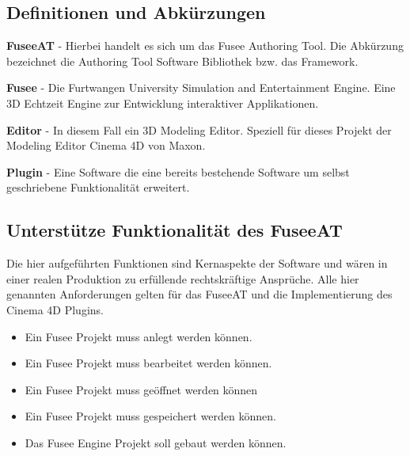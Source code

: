 \documentclass[pagesize, paper=a4, fontsize=12pt, titlepage=true, headings=small, headnosepline, abstractoff, liststotoc, nochapterprefix, plainheadsepline, twoside]{scrreprt}
\begin{document}
\subsection{Definitionen und Abkürzungen}
\textbf{FuseeAT} - Hierbei handelt es sich um das Fusee Authoring Tool. Die Abkürzung bezeichnet die Authoring Tool Software Bibliothek bzw. das Framework.

\textbf{Fusee} - Die Furtwangen University Simulation and Entertainment Engine. Eine 3D Echtzeit Engine zur Entwicklung interaktiver Applikationen.

\textbf{Editor} - In diesem Fall ein 3D Modeling Editor. Speziell für dieses Projekt der Modeling Editor Cinema 4D von Maxon.

\textbf{Plugin} - Eine Software die eine bereits bestehende Software um selbst geschriebene Funktionalität erweitert.

\subsection{Unterstütze Funktionalität des FuseeAT}
Die hier aufgeführten Funktionen sind Kernaspekte der Software und wären in einer realen Produktion zu erfüllende rechtskräftige Ansprüche. Alle hier genannten Anforderungen gelten für das FuseeAT und die Implementierung des Cinema 4D Plugins.
\begin{itemize}
\item Ein Fusee Projekt muss anlegt werden können.
\item Ein Fusee Projekt muss bearbeitet werden können.
\item Ein Fusee Projekt muss geöffnet werden können
\item Ein Fusee Projekt muss gespeichert werden können.
\item Das Fusee Engine Projekt soll gebaut werden können.
\end{itemize}
\end{document}
